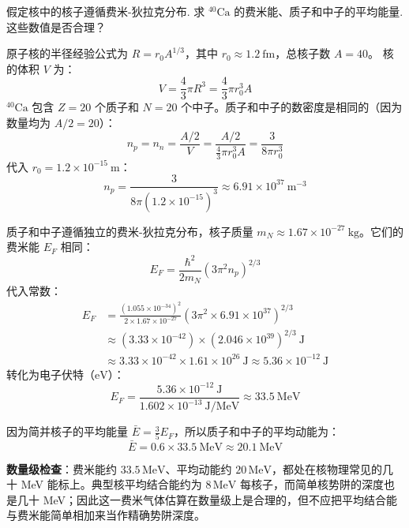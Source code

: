 \begin{exercise}\label{ex:27.6}
假定核中的核子遵循费米-狄拉克分布. 求 $^{40}\mathrm{Ca}$ 的费米能、质子和中子的平均能量. 这些数值是否合理？
\end{exercise}
\begin{solution}
原子核的半径经验公式为 $R = r_0 A^{1/3}$，其中 $r_0 \approx 1.2 \ \mathrm{fm}$，总核子数 $A = 40$。
核的体积 $V$ 为：
$$ V = \frac{4}{3} \pi R^3 = \frac{4}{3} \pi r_0^3 A $$
$^{40}\mathrm{Ca}$ 包含 $Z=20$ 个质子和 $N=20$ 个中子。质子和中子的数密度是相同的（因为数量均为 $A/2 = 20$）：
$$ n_p = n_n = \frac{A/2}{V} = \frac{A/2}{\frac{4}{3} \pi r_0^3 A} = \frac{3}{8\pi r_0^3} $$
代入 $r_0 = 1.2 \times 10^{-15} \ \mathrm{m}$：
$$ n_p = \frac{3}{8\pi (1.2 \times 10^{-15})^3} \approx 6.91 \times 10^{37} \ \mathrm{m^{-3}} $$

质子和中子遵循独立的费米-狄拉克分布，核子质量 $m_N \approx 1.67 \times 10^{-27} \ \mathrm{kg}$。它们的费米能 $E_F$ 相同：
$$ E_F = \frac{\hbar^2}{2m_N} (3\pi^2 n_p)^{2/3} $$
代入常数：
\begin{align*}
    E_F &= \frac{(1.055 \times 10^{-34})^2}{2 \times 1.67 \times 10^{-27}} \left( 3\pi^2 \times 6.91 \times 10^{37} \right)^{2/3} \\
        &\approx (3.33 \times 10^{-42}) \times (2.046 \times 10^{39})^{2/3} \ \mathrm{J} \\
        &\approx 3.33 \times 10^{-42} \times 1.61 \times 10^{26} \ \mathrm{J} \approx 5.36 \times 10^{-12} \ \mathrm{J}
\end{align*}
转化为电子伏特（$\mathrm{eV}$）：
$$ E_F = \frac{5.36 \times 10^{-12} \ \mathrm{J}}{1.602 \times 10^{-13} \ \mathrm{J/MeV}} \approx 33.5 \ \mathrm{MeV} $$

因为简并核子的平均能量 $\bar{E} = \frac{3}{5} E_F$，所以质子和中子的平均动能为：
$$ \bar{E} = 0.6 \times 33.5 \ \mathrm{MeV} \approx 20.1 \ \mathrm{MeV} $$

\textbf{数量级检查}：费米能约 $33.5\,\mathrm{MeV}$、平均动能约 $20\,\mathrm{MeV}$，都处在核物理常见的几十 MeV 能标上。典型核平均结合能约为 $8\,\mathrm{MeV}$ 每核子，而简单核势阱的深度也是几十 MeV；因此这一费米气体估算在数量级上是合理的，但不应把平均结合能与费米能简单相加来当作精确势阱深度。
\end{solution}

